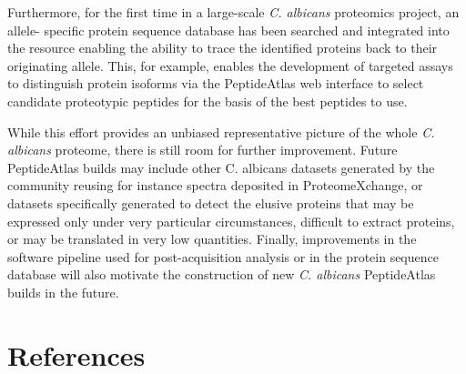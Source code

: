 Furthermore, for the first time in a large-scale \textit{C. albicans} proteomics project, an allele-
specific protein sequence database has been searched and integrated into the resource
enabling the ability to trace the identified proteins back to their originating allele. This, for
example, enables the development of targeted assays to distinguish protein isoforms via the
PeptideAtlas web interface \citep{Farrah2011} to select candidate proteotypic peptides for the basis of the
best peptides to use.

While this effort provides an unbiased representative picture of the whole \textit{C. albicans}
proteome, there is still room for further improvement. Future PeptideAtlas builds may include other C. albicans
datasets generated by the community reusing for instance spectra deposited in ProteomeXchange,
or datasets specifically generated to detect the elusive proteins that may be expressed only
under very particular circumstances, difficult to extract proteins, or may be translated in very
low quantities. Finally, improvements in the software pipeline used for post-acquisition
analysis or in the protein sequence database will also motivate the construction of new
\textit{C. albicans} PeptideAtlas builds in the future.











\section*{References}

